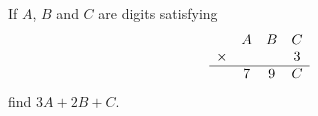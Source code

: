 If $A$, $B$ and $C$ are digits satisfying
\[\begin{array}{cccc}&A&B&C\\\times&&&3\\\hline&7&9&C\end{array}\]
find $3A+2B+C$.
